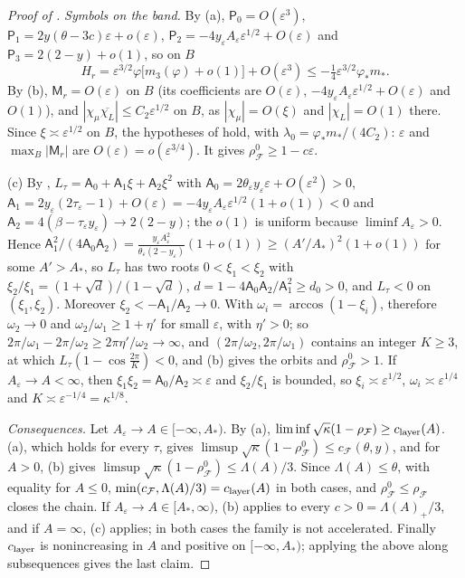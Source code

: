 \documentclass[11pt]{article}
\theoremstyle{definition}
\theoremstyle{remark}
\newcommand{\cF}{\mathcal F}
\newcommand{\sfP}{\mathsf P}
\newcommand{\rhoF}{\rho_{\cF}}
\newcommand{\rhoz}{\rho_{\cF}^{0}}
\newcommand{\cFF}{c_{\cF}}
\begin{document}
\begin{proof}[Proof of ]
\emph{Symbols on the band.}  By (a), \(\sfP_0=O(\varepsilon^3)\),
\(\sfP_1=2y(\theta-3c)\varepsilon+o(\varepsilon)\), \(\sfP_2=-4y_\varepsilon A_\varepsilon\varepsilon^{1/2}+O(\varepsilon)\) and
\(\sfP_3=2(2-y)+o(1)\), so on \(B\)
\[
H_r=\varepsilon^{3/2}\varphi\bigl[m_3(\varphi)+o(1)\bigr]+O(\varepsilon^3)\le-\tfrac14\varepsilon^{3/2}\varphi_*m_* .
\]
By (b), \(\mathsf M_r=O(\varepsilon)\) on \(B\) (its coefficients are \(O(\varepsilon)\), \(-4y_\varepsilon A_\varepsilon\varepsilon^{1/2}+O(\varepsilon)\) and \(O(1)\)),
and \(|\chi_\mu\overline{\chi_L}|\le C_2\varepsilon^{1/2}\) on \(B\), as \(|\chi_\mu|=O(\xi)\) and \(|\chi_L|=O(1)\) there.  Since \(\xi\asymp\varepsilon^{1/2}\) on \(B\), the
hypotheses of  hold, with \(\lambda_0=\varphi_*m_*/(4C_2)\): \(\varepsilon\) and \(\max_B|\mathsf M_r|\) are \(O(\varepsilon)=o(\varepsilon^{3/4})\).  It gives
\(\rhoz\ge1-c\varepsilon\).

(c) By , \(L_\tau=\mathsf A_0+\mathsf A_1\xi+\mathsf A_2\xi^2\) with
\(\mathsf A_0=2\theta_\varepsilon y_\varepsilon\varepsilon+O(\varepsilon^2)>0\),
\(\mathsf A_1=2y_\varepsilon(2\tau_\varepsilon-1)+O(\varepsilon)=-4y_\varepsilon A_\varepsilon\varepsilon^{1/2}(1+o(1))<0\) and
\(\mathsf A_2=4(\beta-\tau_\varepsilon y_\varepsilon)\to2(2-y)\); the \(o(1)\) is uniform because
\(\liminf A_\varepsilon>0\).  Hence
\(\mathsf A_1^2/(4\mathsf A_0\mathsf A_2)=\frac{y_\varepsilon A_\varepsilon^2}{\theta_\varepsilon(2-y_\varepsilon)}(1+o(1))\ge(A'/A_*)^2(1+o(1))\) for some
\(A'>A_*\), so \(L_\tau\) has two roots \(0<\xi_1<\xi_2\) with
\(\xi_2/\xi_1=(1+\sqrt d)/(1-\sqrt d)\), \(d=1-4\mathsf A_0\mathsf A_2/\mathsf A_1^2\ge d_0>0\), and \(L_\tau<0\) on
\((\xi_1,\xi_2)\).  Moreover \(\xi_2<-\mathsf A_1/\mathsf A_2\to0\).  With \(\omega_i=\arccos(1-\xi_i)\), therefore
\(\omega_2\to0\) and \(\omega_2/\omega_1\ge1+\eta'\) for small \(\varepsilon\), with \(\eta'>0\); so
\(2\pi/\omega_1-2\pi/\omega_2\ge2\pi\eta'/\omega_2\to\infty\), and \((2\pi/\omega_2,2\pi/\omega_1)\) contains an integer \(K\ge3\), at which
\(L_\tau(1-\cos\frac{2\pi}K)<0\), and (b) gives the orbits and \(\rhoz>1\).  If
\(A_\varepsilon\to A<\infty\), then \(\xi_1\xi_2=\mathsf A_0/\mathsf A_2\asymp\varepsilon\) and \(\xi_2/\xi_1\) is bounded, so
\(\xi_i\asymp\varepsilon^{1/2}\), \(\omega_i\asymp\varepsilon^{1/4}\) and \(K\asymp\varepsilon^{-1/4}=\kappa^{1/8}\).

\emph{Consequences.}  Let \(A_\varepsilon\to A\in[-\infty,A_*)\).  By (a),
\(\liminf\sqrt\kappa(1-\rhoF)\ge\clayer(A)\).  (a), which holds for every \(\tau\), gives
\(\limsup\sqrt\kappa(1-\rhoz)\le\cFF(\theta,y)\), and for \(A>0\), (b) gives \(\limsup\sqrt\kappa(1-\rhoz)\le\Lambda(A)/3\).
Since \(\Lambda(A)\le\theta\), with equality for \(A\le0\), \(\min(\cFF,\Lambda(A)/3)=\clayer(A)\) in both cases, and
\(\rhoz\le\rhoF\) closes the chain.  If \(A_\varepsilon\to A\in[A_*,\infty)\), (b) applies to every \(c>0=\Lambda(A)_+/3\), and if
\(A=\infty\), (c) applies; in both cases the family is not accelerated.  Finally \(c_{\rm layer}\) is
nonincreasing in \(A\) and positive on \([-\infty,A_*)\); applying the above along subsequences gives the last
claim.
\end{proof}
\end{document}
